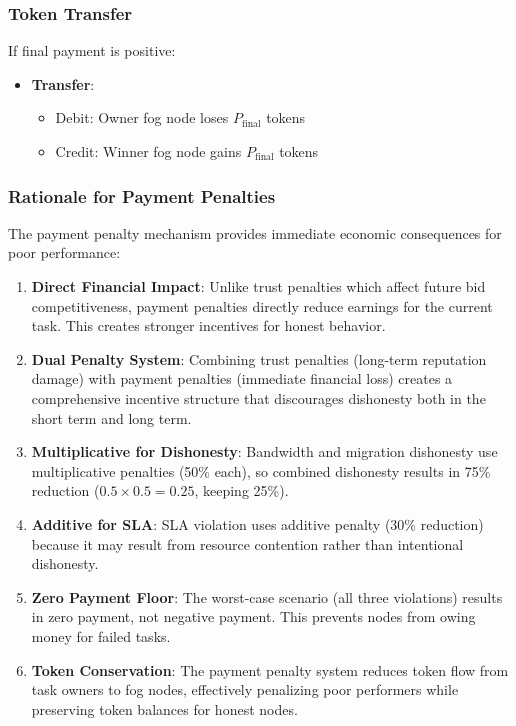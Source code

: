 \documentclass[12pt,a4paper]{article}
\begin{document}
\subsubsection{Token Transfer}

If final payment is positive:
\begin{itemize}
    \item \textbf{Transfer}:
    \begin{itemize}
        \item Debit: Owner fog node loses $P_{\text{final}}$ tokens
        \item Credit: Winner fog node gains $P_{\text{final}}$ tokens
    \end{itemize}
\end{itemize}

\subsubsection{Rationale for Payment Penalties}

The payment penalty mechanism provides immediate economic consequences for poor performance:

\begin{enumerate}
    \item \textbf{Direct Financial Impact}: Unlike trust penalties which affect future bid competitiveness, payment penalties directly reduce earnings for the current task. This creates stronger incentives for honest behavior.
    
    \item \textbf{Dual Penalty System}: Combining trust penalties (long-term reputation damage) with payment penalties (immediate financial loss) creates a comprehensive incentive structure that discourages dishonesty both in the short term and long term.
    
    \item \textbf{Multiplicative for Dishonesty}: Bandwidth and migration dishonesty use multiplicative penalties (50\% each), so combined dishonesty results in 75\% reduction ($0.5 \times 0.5 = 0.25$, keeping 25\%).
    
    \item \textbf{Additive for SLA}: SLA violation uses additive penalty (30\% reduction) because it may result from resource contention rather than intentional dishonesty.
    
    \item \textbf{Zero Payment Floor}: The worst-case scenario (all three violations) results in zero payment, not negative payment. This prevents nodes from owing money for failed tasks.
    
    \item \textbf{Token Conservation}: The payment penalty system reduces token flow from task owners to fog nodes, effectively penalizing poor performers while preserving token balances for honest nodes.
\end{enumerate}
\end{document}
